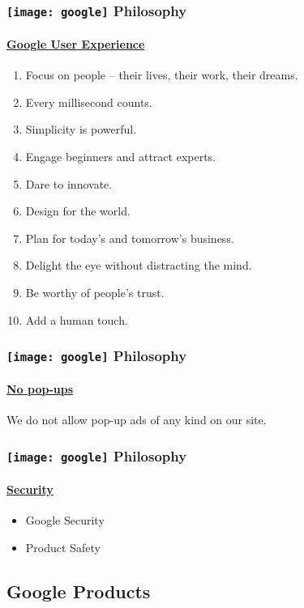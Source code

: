 \documentclass[hyperref={xetex,colorlinks,linkcolor=blue},green,compress]{beamer}
\newcommand\googlelogo{\texttt{[image: google]}}
\begin{document}
\begin{frame}\frametitle{\googlelogo{} Philosophy}
\framesubtitle{\href{http://www.google.com/corporate/ux.html}{Google User Experience}}

\begin{enumerate}
\item Focus on people – their lives, their work, their dreams. 
\item Every millisecond counts. 
\item Simplicity is powerful.
\item Engage beginners and attract experts.
\item Dare to innovate.
\item Design for the world.
\item Plan for today's and tomorrow's business.
\item Delight the eye without distracting the mind.
\item Be worthy of people's trust.
\item Add a human touch.
\end{enumerate}

\end{frame}

\begin{frame}\frametitle{\googlelogo{} Philosophy}
\framesubtitle{\href{http://www.google.com/corporate/nopopupads.html}{No pop-ups}}
We do not allow pop-up ads of any kind on our site.
\end{frame}

\begin{frame}\frametitle{\googlelogo{} Philosophy}
\framesubtitle{\href{http://www.google.com/corporate/security.html}{Security} }

\begin{itemize}
\item Google Security 
\item Product Safety
\end{itemize}

\end{frame}


\subsection{Google Products}
\label{sec:product}
\end{document}
